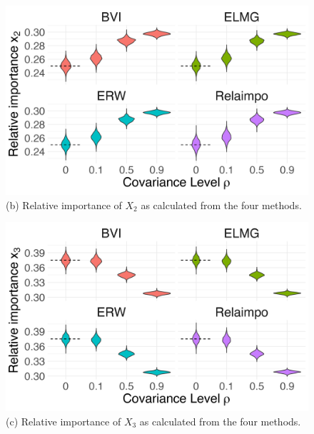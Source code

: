 \begin{figure}[H]\ContinuedFloat
  \centering
    \includegraphics[width=0.7\linewidth]{Figures/ViolinPlots/Variance_V2.png}
    \caption{(b) Relative importance of $X_2$ as calculated from the four methods.}
    \label{fig:relimp_X2}
\end{figure}
\begin{figure}[H]\ContinuedFloat
  \centering
    \includegraphics[width=0.7\linewidth]{Figures/ViolinPlots/Variance_V3.png}
    \caption{(c) Relative importance of $X_3$ as calculated from the four methods.}
    \label{fig:relimp_X3}
\end{figure}




